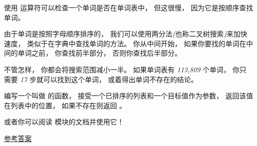 \begin{exercise}
\label{wordlist1}
\label{bisection}
  
  
  

  
  
  



使用 {\em {}} 运算符可以检查一个单词是否在单词表中， 但这很慢， 因为它是按顺序查找单词。


由于单词是按照字母顺序排序的， 我们可以使用两分法{\em (}也称二叉树搜索{\em)}来加快速度，
类似于在字典中查找单词的方法。  你从中间开始， 如果你要找的单词在中间的单词之前， 你查找前半部分， 否则你查找后半部分。


不管怎样， 你都会将搜索范围减小一半。
如果单词表有 {\em 113,809} 个单词， 你只需要 {\em 17} 步就可以找到这个单词， 或着得出单词不存在的结论。


编写一个叫做 {\em {}} 的函数， 接受一个已排序的列表和一个目标值作为参数，
返回该值在列表中的位置， 如果不存在则返回 {\em {}} 。

  


或者你可以阅读 {\em {}} 模块的文档并使用它！

\href{http://thinkpython2.com/code/inlist.py}{参考答案}

\end{exercise}

